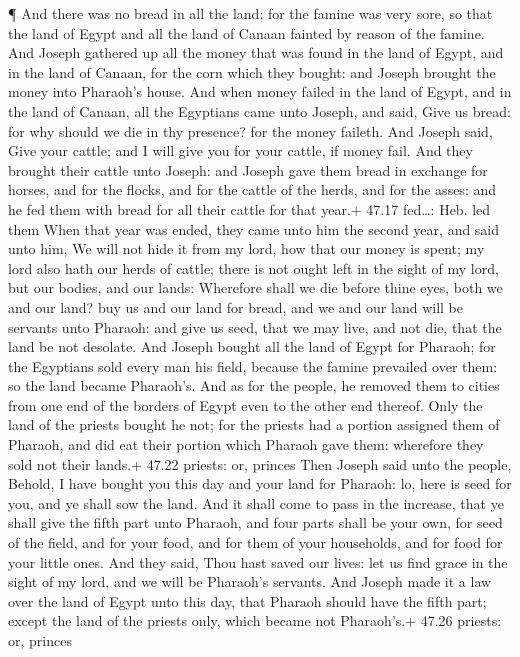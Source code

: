 ¶ And there was no bread in all the land; for the famine
was very sore, so that the land of Egypt and all the land of Canaan
fainted by reason of the famine.  And Joseph gathered up
all the money that was found in the land of Egypt, and in the land of
Canaan, for the corn which they bought: and Joseph brought the money
into Pharaoh's house.  And when money failed in the land of
Egypt, and in the land of Canaan, all the Egyptians came unto Joseph,
and said, Give us bread: for why should we die in thy presence? for the
money faileth.  And Joseph said, Give your cattle; and I
will give you for your cattle, if money fail.  And they
brought their cattle unto Joseph: and Joseph gave them bread in exchange
for horses, and for the flocks, and for the cattle of the herds, and for
the asses: and he fed them with bread for all their cattle for that
year.+ 47.17 fed\ldots: Heb. led them  When that year was
ended, they came unto him the second year, and said unto him, We will
not hide it from my lord, how that our money is spent; my lord also hath
our herds of cattle; there is not ought left in the sight of my lord,
but our bodies, and our lands:  Wherefore shall we die
before thine eyes, both we and our land? buy us and our land for bread,
and we and our land will be servants unto Pharaoh: and give us seed,
that we may live, and not die, that the land be not desolate.
 And Joseph bought all the land of Egypt for Pharaoh; for
the Egyptians sold every man his field, because the famine prevailed
over them: so the land became Pharaoh's.  And as for the
people, he removed them to cities from one end of the borders of Egypt
even to the other end thereof.  Only the land of the
priests bought he not; for the priests had a portion assigned them of
Pharaoh, and did eat their portion which Pharaoh gave them: wherefore
they sold not their lands.+ 47.22 priests: or, princes 
Then Joseph said unto the people, Behold, I have bought you this day and
your land for Pharaoh: lo, here is seed for you, and ye shall sow the
land.  And it shall come to pass in the increase, that ye
shall give the fifth part unto Pharaoh, and four parts shall be your
own, for seed of the field, and for your food, and for them of your
households, and for food for your little ones.  And they
said, Thou hast saved our lives: let us find grace in the sight of my
lord, and we will be Pharaoh's servants.  And Joseph made
it a law over the land of Egypt unto this day, that Pharaoh should have
the fifth part; except the land of the priests only, which became not
Pharaoh's.+ 47.26 priests: or, princes


